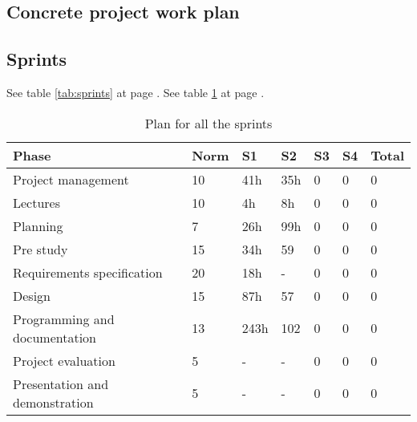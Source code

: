 

\subsection{Concrete project work plan}

\subsection*{Sprints}
See table \ref{tab:sprints} at page \pageref{tab:sprints}.
\newline
\newline
See table \ref{tab:allsprints} at page \pageref{tab:allsprints}.
\begin{table}
\begin{tabular}{l|l|l|l|l|l|l}
\textbf{Phase} &  \textbf{Norm} & \textbf{S1} & \textbf{S2}  & \textbf{S3} & \textbf{S4} & \textbf{Total} \\ \hline \hline
Project management & 10 & 41h & 35h & 0 & 0 & 0\\ \hline
Lectures & 10 & 4h & 8h & 0 & 0 & 0\\ \hline
Planning & 7 & 26h & 99h & 0 & 0 & 0\\ \hline
Pre study & 15 & 34h & 59 & 0 & 0 & 0\\ \hline
Requirements specification & 20 & 18h & - & 0 & 0 & 0\\ \hline
Design & 15 & 87h & 57 & 0 & 0 & 0\\ \hline
Programming and documentation & 13 & 243h & 102 & 0 & 0 & 0\\ \hline
Project evaluation & 5 & - & - & 0 & 0 & 0\\ \hline
Presentation and demonstration & 5 & - & - & 0 & 0 & 0
\end{tabular}
\caption{Plan for all the sprints} \label{tab:allsprints}
\end{table}

